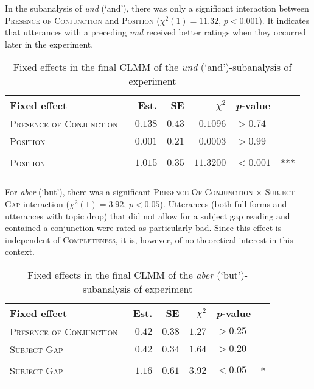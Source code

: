In the subanalysis of \textit{und} (`and'), there was only a significant interaction between \textsc{Presence of Conjunction} and \textsc{Position} ($\chi^2(1) = 11.32$, $p < 0.001 $).
It indicates that utterances with a preceding \textit{und} received better ratings when they occurred later in the experiment.

\begin{table}
\caption{Fixed effects in the final CLMM of the \textit{und} (`and')-subanalysis of experiment }
\centering
\begin{tabular}{lrrrll}
\lsptoprule
Fixed effect & Est. & SE & $\chi^2$ & \textit{p}-value &   \\
\midrule
\textsc{Presence of Conjunction} & $0.138$  & $0.43$ & $0.1096$ & $> 0.74$ & \\
\textsc{Position} & $0.001$ & $0.21$ & $0.0003$ & $> 0.99$ & \\
\Centerstack[l]{\textsc{Presence of Conjunction}  $\times$ \\\textsc{Position}} & $-1.015$ & $0.35$ & $11.3200$  & $< 0.001$ & ***\\
\lspbottomrule
\end{tabular}
\label{tab:conjunction.und.model}
\end{table}

\newpage
For \textit{aber} (`but'), there was a significant \textsc{Presence Of Conjunction} $\times$ \textsc{Subject Gap} interaction ($\chi^2(1) = 3.92$, $p < 0.05 $).
Utterances (both full forms and utterances with topic drop) that did not allow for a subject gap reading and contained a conjunction were rated as particularly bad.
Since this effect is independent of \textsc{Completeness}, it is, however, of no theoretical interest in this context.

\begin{table}
\caption{Fixed effects in the final CLMM of the \textit{aber} (`but')-subanalysis of experiment }
\centering
\begin{tabular}{lrrrll}
\lsptoprule
Fixed effect & Est. & SE & $\chi^2$ & \textit{p}-value &   \\
\midrule
\textsc{Presence of Conjunction} & $0.42$  & $0.38$ & $1.27$ & $> 0.25$ & \\
\textsc{Subject Gap} & $0.42$ & $0.34$ & $1.64$ & $> 0.20$ & \\
\Centerstack[l]{\textsc{Presence of Conjunction} $\times$ \\\textsc{Subject Gap}} & $-1.16$ & $0.61$ & $3.92$ & $< 0.05$ & *\\
\lspbottomrule
\end{tabular}
\label{tab:conjunction.aber.model}
\end{table}

